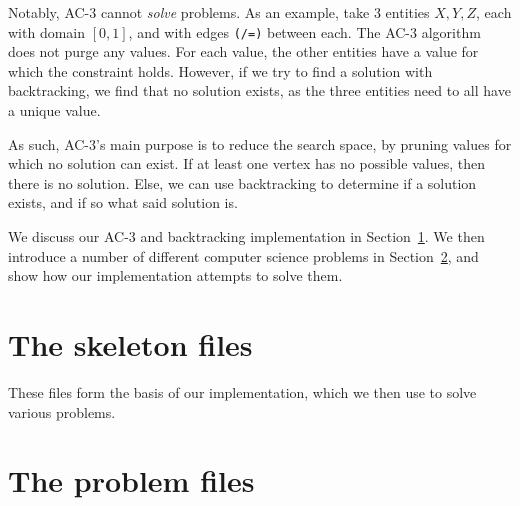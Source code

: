 \documentclass[12pt,a4paper]{article}
\begin{document}

Notably, AC-3 cannot \emph{solve} problems. As an example, take 3 entities $X,Y,Z$, 
each with domain $[0,1]$, and with edges \verb:(/=): between each. 
The AC-3 algorithm does not purge any values. For each value, the other entities have a 
value for which the constraint holds.
However, if we try to find a solution with backtracking, we find that no solution exists, as 
the three entities need to all have a unique value. 

As such, AC-3's main purpose is to reduce the search space, by pruning values for which no
 solution can exist. If at least one vertex has no possible values, then there is no solution.
Else, we can use backtracking to determine if a solution exists, and if so what said solution is.

We discuss our AC-3 and backtracking implementation in Section~\ref{sec:skeleton}. 
We then introduce a number of different computer science problems in Section~\ref{sec:problems}, and show how our implementation
attempts to solve them. 

\section{The skeleton files}\label{sec:skeleton}
These files form the basis of our implementation, which we then use to solve various problems.





\section{The problem files}\label{sec:problems} %















% 





\end{document}
